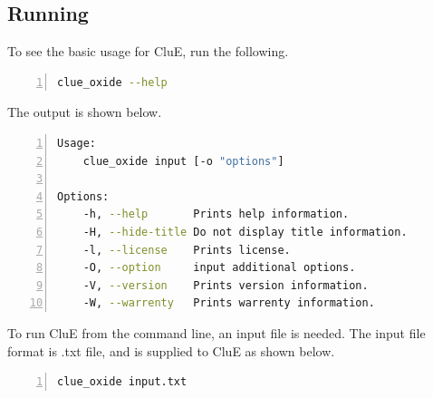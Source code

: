 \documentclass{book}
\begin{document}
\subsection{Running}
To see the basic usage for CluE, run the following.
\begin{lstlisting}[frame=single,numbers=left,language=bash]
clue_oxide --help
\end{lstlisting}
The output is shown below.
\begin{lstlisting}[frame=single,numbers=left,language=bash]
Usage:
    clue_oxide input [-o "options"]

Options:
    -h, --help       Prints help information.
    -H, --hide-title Do not display title information.
    -l, --license    Prints license.
    -O, --option     input additional options.
    -V, --version    Prints version information.
    -W, --warrenty   Prints warrenty information.
\end{lstlisting}
To run CluE from the command line, an input file is needed.
The input file format is .txt file, and is supplied to CluE as shown below. 
\begin{lstlisting}[frame=single,numbers=left,language=bash]
clue_oxide input.txt
\end{lstlisting}
\end{document}
